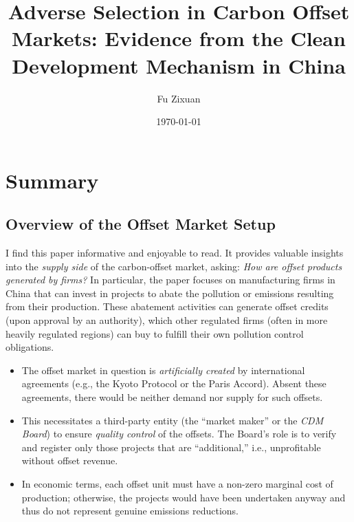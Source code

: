 \documentclass[12pt]{article}[margin=1in]
\title{\textbf{Adverse Selection in Carbon Offset Markets: Evidence from the Clean Development Mechanism
in China}}
\author{Fu Zixuan}
\date{\today}
\begin{document}
\maketitle





\section{Summary}

\subsection{Overview of the Offset Market Setup}

I find this paper informative and enjoyable to read. It provides valuable insights into the \emph{supply side} of the carbon-offset market, asking: \emph{How are offset products generated by firms?} In particular, the paper focuses on manufacturing firms in China that can invest in projects to abate the pollution or emissions resulting from their production. These abatement activities can generate offset credits (upon approval by an authority), which other regulated firms (often in more heavily regulated regions) can buy to fulfill their own pollution control obligations.

\begin{itemize}
    \item The offset market in question is \emph{artificially created} by international agreements (e.g., the Kyoto Protocol or the Paris Accord). Absent these agreements, there would be neither demand nor supply for such offsets.
    \item This necessitates a third-party entity (the ``market maker'' or the \emph{CDM Board}) to ensure \emph{quality control} of the offsets. The Board’s role is to verify and register only those projects that are ``additional,'' i.e., unprofitable without offset revenue.
    \item In economic terms, each offset unit must have a non-zero marginal cost of production; otherwise, the projects would have been undertaken anyway and thus do not represent genuine emissions reductions.
\end{itemize}
\end{document}
